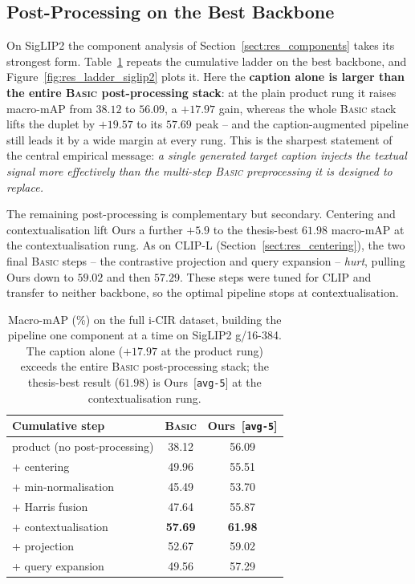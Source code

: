 \subsection{Post-Processing on the Best Backbone}\label{subsect:res_siglip2_ladder}

On SigLIP2 the component analysis of Section~\ref{sect:res_components} takes its
strongest form. Table~\ref{tab:res_siglip2_ladder} repeats the cumulative ladder
on the best backbone, and Figure~\ref{fig:res_ladder_siglip2} plots it. Here the
\textbf{caption alone is larger than the entire \textsc{Basic} post-processing
stack}: at the plain product rung it raises macro-mAP from $38.12$ to $56.09$, a
$+17.97$ gain, whereas the whole \textsc{Basic} stack lifts the duplet by
$+19.57$ to its $57.69$ peak -- and the caption-augmented pipeline still leads it
by a wide margin at every rung. This is the sharpest statement of the central
empirical message: \emph{a single generated target caption injects the textual
signal more effectively than the multi-step \textsc{Basic} preprocessing it is
designed to replace.}

The remaining post-processing is complementary but secondary. Centering and
contextualisation lift Ours a further $+5.9$ to the thesis-best
$\mathbf{61.98}$ macro-mAP at the contextualisation rung. As on CLIP-L
(Section~\ref{sect:res_centering}), the two final \textsc{Basic} steps -- the
contrastive projection and query expansion -- \emph{hurt}, pulling Ours down to
$59.02$ and then $57.29$. These steps were tuned for CLIP and transfer to neither
backbone, so the optimal pipeline stops at contextualisation.

\begin{table}[h!]
\centering
\begin{tabular}{l c c}
\toprule
Cumulative step & \textsc{Basic} & Ours~[\texttt{avg-5}] \\ \midrule
product (no post-processing)   & 38.12 & 56.09 \\
\quad + centering              & 49.96 & 55.51 \\
\quad + min-normalisation      & 45.49 & 53.70 \\
\quad + Harris fusion          & 47.64 & 55.87 \\
\quad + contextualisation      & \cellcolor{gray!20}\textbf{57.69} & \cellcolor{gray!20}\textbf{61.98} \\
\quad + projection             & 52.67 & 59.02 \\
\quad + query expansion        & 49.56 & 57.29 \\
\bottomrule
\end{tabular}
\caption[Component ladder on SigLIP2 (full i-CIR).]{Macro-mAP (\%) on the full
i-CIR dataset, building the pipeline one component at a time on SigLIP2
g/16-384. The caption alone ($+17.97$ at the product rung) exceeds the entire
\textsc{Basic} post-processing stack; the thesis-best result ($61.98$) is
Ours~[\texttt{avg-5}] at the contextualisation
rung.\label{tab:res_siglip2_ladder}}
\end{table}

